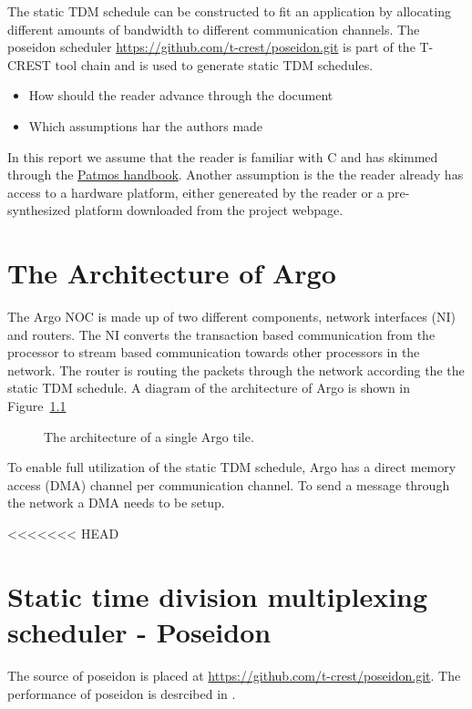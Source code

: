 \documentclass[a4paper,fontsize=10pt,twoside,DIV15,BCOR12mm,headinclude=true,footinclude=false,pagesize,bibtotoc]{scrbook}
\begin{document}
The static TDM schedule can be constructed to fit an application by allocating different amounts of bandwidth to different communication channels.
The poseidon scheduler \url{https://github.com/t-crest/poseidon.git} is part of the T-CREST tool chain and is used to generate static TDM schedules.

\begin{itemize}
\item How should the reader advance through the document
\item Which assumptions har the authors made
\end{itemize}

In this report we assume that the reader is familiar with C and has skimmed through the \href{http://patmos.compute.dtu.dk/patmos_handbook.pdf}{Patmos handbook}.
Another assumption is the the reader already has access to a hardware platform, either genereated by the reader or a pre-synthesized platform downloaded from the project webpage.




\chapter{The Architecture of Argo}
\label{sec:arch}

The Argo NOC is made up of two different components,
network interfaces (NI) and routers.
The NI converts the transaction based communication from the processor to
stream based communication towards other processors in the network.
The router is routing the packets through the network according the the static TDM schedule.
A diagram of the architecture of Argo is shown in Figure~\ref{fig:diag}

\begin{figure}
\label{fig:diag}
\centering
\caption{The architecture of a single Argo tile.}
\end{figure}

To enable full utilization of the static TDM schedule,
Argo has a direct memory access (DMA) channel per communication channel.
To send a message through the network a DMA needs to be setup.


<<<<<<< HEAD

\chapter{Static time division multiplexing scheduler - Poseidon}
The source of poseidon is placed at \url{https://github.com/t-crest/poseidon.git}.
The performance of poseidon is desrcibed in \cite{}.%
\end{document}
